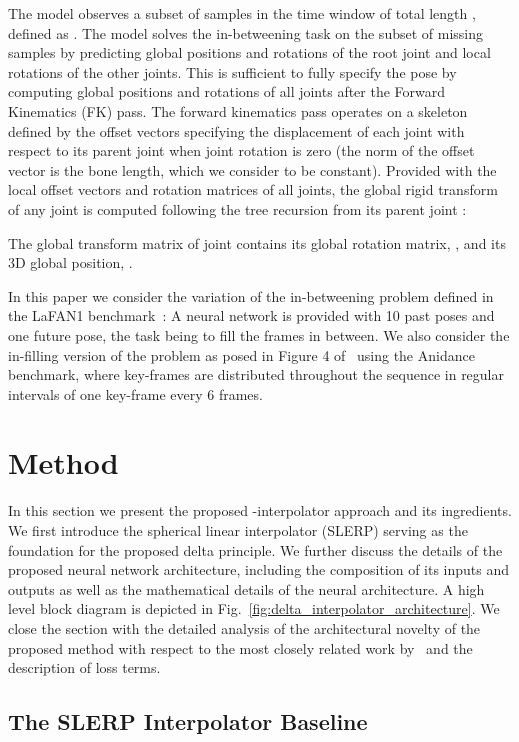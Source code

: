 \documentclass[letterpaper]{article} \usepackage[]{aaai23}  \usepackage{times}  \usepackage{helvet}  \usepackage{courier}  \usepackage[hyphens]{url}  \usepackage{graphicx} \urlstyle{rm} \def\UrlFont{\rm}  \usepackage{natbib}  \usepackage{caption} \frenchspacing  \setlength{\pdfpagewidth}{8.5in} \setlength{\pdfpageheight}{11in}
\begin{document}
The model observes a subset of samples in the time window  of total length , defined as . The model solves the in-betweening task on the subset  of missing samples  by predicting global positions and rotations of the root joint and local rotations of the other joints. This is sufficient to fully specify the pose by computing global positions and rotations of all joints after the Forward Kinematics (FK) pass. The forward kinematics pass operates on a skeleton defined by the offset vectors  specifying the displacement of each joint with respect to its parent joint when joint  rotation is zero (the norm of the offset vector is the bone length, which we consider to be constant). Provided with the local offset vectors and rotation matrices of all joints, the global rigid transform of any joint  is computed following the tree recursion from its parent joint :

The global transform matrix  of joint  contains its global rotation matrix, , and its 3D global position, .

In this paper we consider the variation of the in-betweening problem defined in the LaFAN1 benchmark~\cite{harvey2018recurrent}: A neural network is provided with 10 past poses and one future pose, the task being to fill the frames in between.
We also consider the in-filling version of the problem as posed in Figure 4 of~\citet{duan2021singleshot_arxiv} using the Anidance benchmark, where key-frames are distributed throughout the sequence in regular intervals of one key-frame every 6 frames.


\section{Method} \label{sec:method}

In this section we present the proposed -interpolator approach and its ingredients. We first introduce the spherical linear interpolator (SLERP) serving as the foundation for the proposed delta principle. We further discuss the details of the proposed neural network architecture, including the composition of its inputs and outputs as well as the mathematical details of the neural architecture. A high level block diagram is depicted in Fig.~\ref{fig:delta_interpolator_architecture}. We close the section with the detailed analysis of the architectural novelty of the proposed method with respect to the most closely related work by~\citet{duan2021singleshot} and the description of loss terms.

\subsection{The SLERP Interpolator Baseline}
\end{document}
